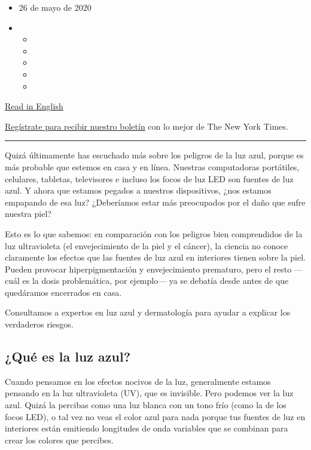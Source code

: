 \begin{itemize}
\item
  26 de mayo de 2020
\item
  \begin{itemize}
  \item
  \item
  \item
  \item
  \item
  \end{itemize}
\end{itemize}

\href{https://www.nytimes3xbfgragh.onion/2020/05/20/style/skin-damage-blue-light-what-is-all-of-that-screen-time-doing-to-your-skin.html}{Read
in English}

\href{https://www.nytimes3xbfgragh.onion/newsletters/el-times}{Regístrate
para recibir nuestro boletín} con lo mejor de The New York Times.

\begin{center}\rule{0.5\linewidth}{\linethickness}\end{center}

Quizá últimamente has escuchado más sobre los peligros de la luz azul,
porque es más probable que estemos en casa y en línea. Nuestras
computadoras portátiles, celulares, tabletas, televisores e incluso los
focos de luz LED son fuentes de luz azul. Y ahora que estamos pegados a
nuestros dispositivos, ¿nos estamos empapando de esa luz? ¿Deberíamos
estar más preocupados por el daño que sufre nuestra piel?

Esto es lo que sabemos: en comparación con los peligros bien
comprendidos de la luz ultravioleta (el envejecimiento de la piel y el
cáncer), la ciencia no conoce claramente los efectos que las fuentes de
luz azul en interiores tienen sobre la piel. Pueden provocar
hiperpigmentación y envejecimiento prematuro, pero el resto ---cuál es
la dosis problemática, por ejemplo--- ya se debatía desde antes de que
quedáramos encerrados en casa.

Consultamos a expertos en luz azul y dermatología para ayudar a explicar
los verdaderos riesgos.

\hypertarget{quuxe9-es-la-luz-azul}{%
\subsection{¿Qué es la luz azul?}\label{quuxe9-es-la-luz-azul}}

Cuando pensamos en los efectos nocivos de la luz, generalmente estamos
pensando en la luz ultravioleta (UV), que es invisible. Pero podemos ver
la luz azul. Quizá la percibas como una luz blanca con un tono frío
(como la de los focos LED), o tal vez no veas el color azul para nada
porque tus fuentes de luz en interiores están emitiendo longitudes de
onda variables que se combinan para crear los colores que percibes.

